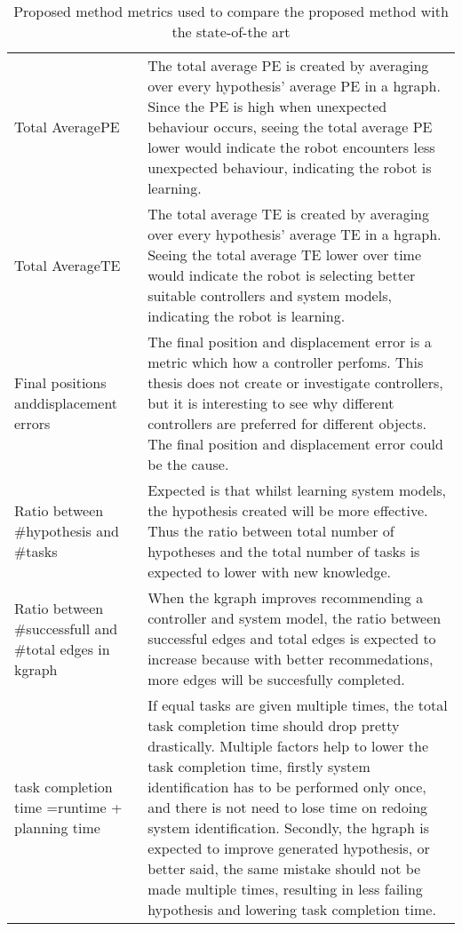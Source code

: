 \begin{table}[htb!]
\centering
\begin{tabular}[t]{p{4cm} p{10cm}}
Total Average\newline \acl{PE} & The total average \ac{PE} is created by averaging over every hypothesis' average \ac{PE} in a \ac{hgraph}. Since the \ac{PE} is high when unexpected behaviour occurs, seeing the total average \ac{PE} lower would indicate the robot encounters less unexpected behaviour, indicating the robot is learning.\\
Total Average\newline \acl{TE}& The total average \ac{TE} is created by averaging over every hypothesis' average \ac{TE} in a \ac{hgraph}. Seeing the total average \ac{TE} lower over time would indicate the robot is selecting better suitable controllers and system models, indicating the robot is learning.\\
Final positions and\newline displacement errors & The final position and displacement error is a metric which how a controller perfoms. This thesis does not create or investigate controllers, but it is interesting to see why different controllers are preferred for different objects. The final position and displacement error could be the cause.\\
Ratio between \#hypothesis and \#tasks & Expected is that whilst learning system models, the hypothesis created will be more effective. Thus the ratio between total number of hypotheses and the total number of tasks is expected to lower with new knowledge.\\
Ratio between \#successfull and \#total edges in \ac{kgraph} & When the \ac{kgraph} improves recommending a controller and system model, the ratio between successful edges and total edges is expected to increase because with better recommedations, more edges will be succesfully completed.\\
task completion time =\newline runtime + planning time& If equal tasks are given multiple times, the total task completion time should drop pretty drastically. Multiple factors help to lower the task completion time, firstly system identification has to be performed only once, and there is not need to lose time on redoing system identification. Secondly, the \ac{hgraph} is expected to improve generated hypothesis, or better said, the same mistake should not be made multiple times, resulting in less failing hypothesis and lowering task completion time.\\
\end{tabular}
\caption{Proposed method metrics used to compare the proposed method with the state-of-the art}
\label{table:proposed_method_metrics}
\end{table}

